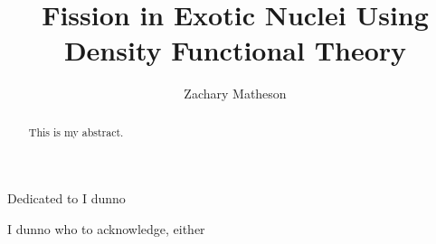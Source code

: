 \documentclass{msuphddissertation}
\author{Zachary Matheson} %
\title{Fission in Exotic Nuclei Using Density Functional Theory} %
\begin{document}
\maketitlepage %


\begin{abstract}
This is my abstract.
\end{abstract}




\begin{dedication} 
Dedicated to I dunno
\end{dedication}

\begin{acknowledgment}
I dunno who to acknowledge, either
\end{acknowledgment}
\end{document}
